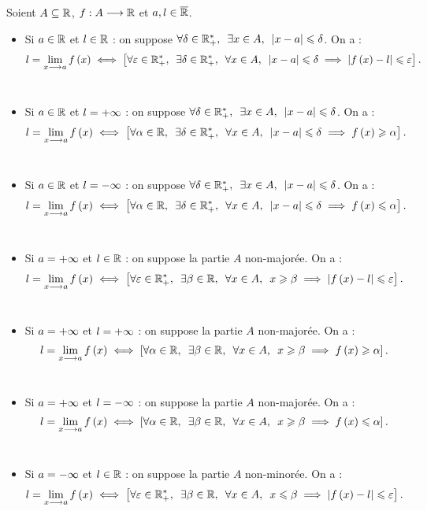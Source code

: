 \begin{prop}
Soient \(A\subseteq\mathbb{R}\), \(f:A\longrightarrow\mathbb{R}\) et \(a,l\in\overline{\mathbb{R}}\).

\begin{itemize}
\item Si \(a\in\mathbb{R}\) et \(l\in\mathbb{R}\) : on suppose \(\quantifs{\forall\delta\in\Rps;\exists x\in A}\abs{x-a}\leq\delta\). On a : \[l=\lim_{x\to a}f\paren{x}\ssi\croch{\quantifs{\forall\epsilon\in\Rps;\exists\delta\in\Rps;\forall x\in A}\abs{x-a}\leq\delta\imp\abs{f\paren{x}-l}\leq\epsilon}.\] \\

\item Si \(a\in\mathbb{R}\) et \(l=+\infty\) : on suppose \(\quantifs{\forall\delta\in\Rps;\exists x\in A}\abs{x-a}\leq\delta\). On a : \[l=\lim_{x\to a}f\paren{x}\ssi\croch{\quantifs{\forall\alpha\in\R;\exists\delta\in\Rps;\forall x\in A}\abs{x-a}\leq\delta\imp f\paren{x}\geq\alpha}.\] \\

\item Si \(a\in\mathbb{R}\) et \(l=-\infty\) : on suppose \(\quantifs{\forall\delta\in\Rps;\exists x\in A}\abs{x-a}\leq\delta\). On a : \[l=\lim_{x\to a}f\paren{x}\ssi\croch{\quantifs{\forall\alpha\in\R;\exists\delta\in\Rps;\forall x\in A}\abs{x-a}\leq\delta\imp f\paren{x}\leq\alpha}.\] \\

\item Si \(a=+\infty\) et \(l\in\mathbb{R}\) : on suppose la partie \(A\) non-majorée. On a : \[l=\lim_{x\to a}f\paren{x}\ssi\croch{\quantifs{\forall\epsilon\in\Rps;\exists\beta\in\R;\forall x\in A}x\geq\beta\imp\abs{f\paren{x}-l}\leq\epsilon}.\] \\

\item Si \(a=+\infty\) et \(l=+\infty\) : on suppose la partie \(A\) non-majorée. On a : \[l=\lim_{x\to a}f\paren{x}\ssi\croch{\quantifs{\forall\alpha\in\R;\exists\beta\in\R;\forall x\in A}x\geq\beta\imp f\paren{x}\geq\alpha}.\] \\

\item Si \(a=+\infty\) et \(l=-\infty\) : on suppose la partie \(A\) non-majorée. On a : \[l=\lim_{x\to a}f\paren{x}\ssi\croch{\quantifs{\forall\alpha\in\R;\exists\beta\in\R;\forall x\in A}x\geq\beta\imp f\paren{x}\leq\alpha}.\] \\

\item Si \(a=-\infty\) et \(l\in\mathbb{R}\) : on suppose la partie \(A\) non-minorée. On a : \[l=\lim_{x\to a}f\paren{x}\ssi\croch{\quantifs{\forall\epsilon\in\Rps;\exists\beta\in\R;\forall x\in A}x\leq\beta\imp\abs{f\paren{x}-l}\leq\epsilon}.\] \\


\end{itemize}
\end{prop}
